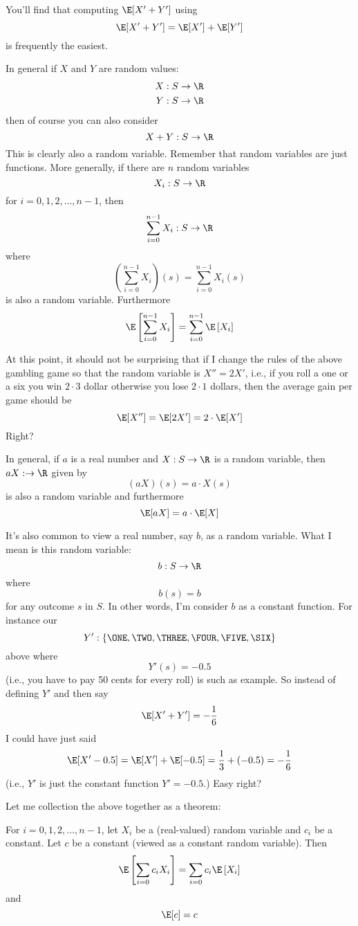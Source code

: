 You'll find that computing $\E[X' + Y']$ using
\[
  \E[X' + Y'] = \E[X'] + \E[Y']
\]
is frequently the easiest.

In general if $X$ and $Y$ are random values:
\begin{align*}
X &: S \rightarrow \R \\
Y &: S \rightarrow \R
\end{align*}
then of course you can also consider
\[
X + Y : S \rightarrow \R
\]
This is clearly also a random variable.
Remember that random variables are just functions.
More generally, if there are $n$ random variables
\[
  X_i : S \rightarrow \R
\]
for $i = 0, 1, 2, \ldots, n - 1$,
then
\[
\sum_{i=0}^{n-1} X_i : S \rightarrow \R
\]
where
\[
\left( \sum_{i=0}^{n-1} X_i \right)(s)
=
\sum_{i=0}^{n-1} X_i(s)
\]
is also a random variable.
Furthermore 
\[
\E \left[ \sum_{i=0}^{n-1} X_i \right]
=
\sum_{i=0}^{n-1} \E \left[ X_i \right]
\]

At this point, it should not be surprising that
if I change the rules of the above gambling game so that
the random variable is $X'' = 2X'$, i.e.,
if you roll a one or a six you win $2 \cdot 3$ dollar
otherwise you lose $2 \cdot 1$ dollars, then
the average gain per game should be
\[
  \E[X''] = \E[2X'] = 2 \cdot \E[X']
\]
Right?

In general, if $a$ is a real number and $X:S \rightarrow \R$
is a random variable, then $aX: \rightarrow \R$ given by
\[
  (aX)(s) = a \cdot X(s)
\]
is also a random variable and furthermore
\[
  \E[aX] = a \cdot \E[X]
\]



It's also common to view a real number, say $b$, as a random variable.
What I mean is this random variable:
\[
  b : S \rightarrow \R
\]
where
\[
b(s) = b
\]
for any outcome $s$ in $S$.
In other words, I'm consider $b$ as a constant function.
For instance our
\[
Y' : \{ \ONE, \TWO, \THREE, \FOUR, \FIVE, \SIX \}
\]
above where
\[
  Y'(s) = -0.5
\]
(i.e., you have to pay 50 cents for every roll) is such as example.
So instead of defining $Y'$ and then say
\[
  \E[X' + Y'] = -\frac{1}{6}
\]
I could have just said
\[
  \E[X' - 0.5] = \E[X'] + \E[-0.5] = \frac{1}{3} + (-0.5) = -\frac{1}{6}
\]
(i.e., $Y'$ is just the constant function $Y' = -0.5$.)
Easy right?


Let me collection the above together as a theorem:

\begin{thm}
  For $i = 0, 1, 2, ..., n - 1$, 
  let $X_i$ be a (real-valued) random variable and $c_i$ be a constant. Let $c$ be a constant (viewed as a constant random variable).
  Then
  \[
  \E\left[ \sum_{i = 0} c_i X_i \right]
  =
  \sum_{i = 0} c_i \E\left[ X_i \right]
  \]
  and
  \[
  \E[c] = c
  \]
\end{thm}

